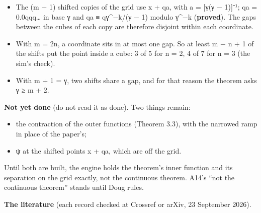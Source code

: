 \begin{enumerate}
\begin{itemize}
\item The (m + 1) shifted copies of the grid use x + qa, with a = [γ(γ − 1)]⁻¹; qa = 0.0qqq… in base γ and qa ≡ qγ\textasciicircum{}−k/(γ − 1) modulo γ\textasciicircum{}−k (\textbf{proved}). The gaps between the cubes of each copy are therefore disjoint within each coordinate.
\item With m = 2n, a coordinate sits in at most one gap. So at least m − n + 1 of the shifts put the point inside a cube: 3 of 5 for n = 2, 4 of 7 for n = 3 (the sim's check).
\item With m + 1 = γ, two shifts share a gap, and for that reason the theorem asks γ ≥ m + 2.
\end{itemize}
\end{enumerate}

\textbf{Not yet done} (do not read it as done). Two things remain:

\begin{itemize}
\item the contraction of the outer functions (Theorem 3.3), with the narrowed ramp in place of the paper's;
\item ψ at the shifted points x + qa, which are off the grid.
\end{itemize}

Until both are built, the engine holds the theorem's inner function and its separation on the grid exactly, not the continuous theorem. A14's “not the continuous theorem” stands until Doug rules.

\textbf{The literature} (each record checked at Crossref or arXiv, 23 September 2026).

